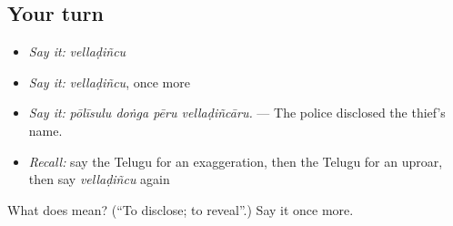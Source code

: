 \subsection*{Your turn}
\begin{itemize}
\raggedright
  \item \emph{Say it:} \emph{vellaḍiñcu}
  \item \emph{Say it:} \emph{vellaḍiñcu}, once more
  \item \emph{Say it:} \emph{pōlīsulu doṅga pēru vellaḍiñcāru.} — The police disclosed the thief's name.
  \item \emph{Recall:} say the Telugu for an exaggeration, then the Telugu for an uproar, then say \emph{vellaḍiñcu} again
\end{itemize}

\begin{tcolorbox}[breakable,colback=teal!4,colframe=teal!35!black,title={Before you move on}]
What does  mean? (\textquotedblleft{}To disclose; to reveal\textquotedblright{}.) Say it once more.
\end{tcolorbox}

